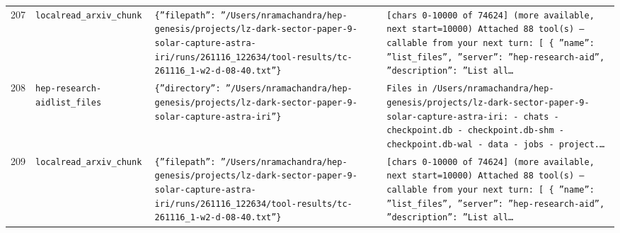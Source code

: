 \documentclass[11pt,a4paper]{article}
\begin{document}
\begin{longtable}{@{}p{}p{}p{}p{}@{}}
207 & \texttt{local}\newline\texttt{read\_\allowbreak{}arxiv\_\allowbreak{}chunk} & \texttt{\{''filepath'':\allowbreak{} ''/\allowbreak{}Users/\allowbreak{}nramachandra/\allowbreak{}hep-genesis/\allowbreak{}projects/\allowbreak{}lz-dark-sector-paper-9-solar-capture-astra-iri/\allowbreak{}runs/\allowbreak{}261116\_\allowbreak{}122634/\allowbreak{}tool-results/\allowbreak{}tc-261116\_\allowbreak{}1-w2-d-08-40.txt''\}\allowbreak{}} & \texttt{[chars 0-10000 of 74624]\allowbreak{} (more available,\allowbreak{} next start=\allowbreak{}10000)\allowbreak{}  Attached 88 tool(s)\allowbreak{} --- callable from your next turn:\allowbreak{} [  \{   ''name'':\allowbreak{} ''list\_\allowbreak{}files'',\allowbreak{}   ''server'':\allowbreak{} ''hep-research-aid'',\allowbreak{}   ''description'':\allowbreak{} ''List all\ldots{}\allowbreak{}} \\
208 & \texttt{hep-research-aid}\newline\texttt{list\_\allowbreak{}files} & \texttt{\{''directory'':\allowbreak{} ''/\allowbreak{}Users/\allowbreak{}nramachandra/\allowbreak{}hep-genesis/\allowbreak{}projects/\allowbreak{}lz-dark-sector-paper-9-solar-capture-astra-iri''\}\allowbreak{}} & \texttt{Files in /\allowbreak{}Users/\allowbreak{}nramachandra/\allowbreak{}hep-genesis/\allowbreak{}projects/\allowbreak{}lz-dark-sector-paper-9-solar-capture-astra-iri:\allowbreak{}   - chats   - checkpoint.db   - checkpoint.db-shm   - checkpoint.db-wal   - data   - jobs   - project.\ldots{}\allowbreak{}} \\
209 & \texttt{local}\newline\texttt{read\_\allowbreak{}arxiv\_\allowbreak{}chunk} & \texttt{\{''filepath'':\allowbreak{} ''/\allowbreak{}Users/\allowbreak{}nramachandra/\allowbreak{}hep-genesis/\allowbreak{}projects/\allowbreak{}lz-dark-sector-paper-9-solar-capture-astra-iri/\allowbreak{}runs/\allowbreak{}261116\_\allowbreak{}122634/\allowbreak{}tool-results/\allowbreak{}tc-261116\_\allowbreak{}1-w2-d-08-40.txt''\}\allowbreak{}} & \texttt{[chars 0-10000 of 74624]\allowbreak{} (more available,\allowbreak{} next start=\allowbreak{}10000)\allowbreak{}  Attached 88 tool(s)\allowbreak{} --- callable from your next turn:\allowbreak{} [  \{   ''name'':\allowbreak{} ''list\_\allowbreak{}files'',\allowbreak{}   ''server'':\allowbreak{} ''hep-research-aid'',\allowbreak{}   ''description'':\allowbreak{} ''List all\ldots{}\allowbreak{}} \\

\end{longtable}
\end{document}
